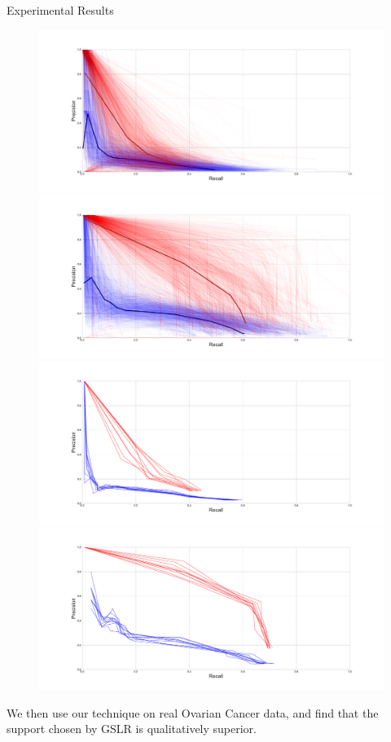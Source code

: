\documentclass[svgnames,final]{beamer}
\begin{document}
\begin{frame}
\begin{columns}[T]
\begin{column}{.3\linewidth}
\begin{block}{Experimental Results}
		\begin{figure}[h]
		\centering
		  \includegraphics[width=.5\linewidth]{images/2.pdf}
		  \includegraphics[width=.5\linewidth]{images/1.pdf}
    \newline
		  \includegraphics[width=.5\linewidth]{images/4.pdf}
		  \includegraphics[width=.5\linewidth]{images/3.pdf}
		\label{fig:perf}
		\end{figure}

		We then use our technique on real Ovarian Cancer data,
		and find that the support chosen by GSLR is qualitatively superior.

	\end{block}

	\vspace{2cm}





\end{column}
\end{columns}
\end{frame}
\end{document}
